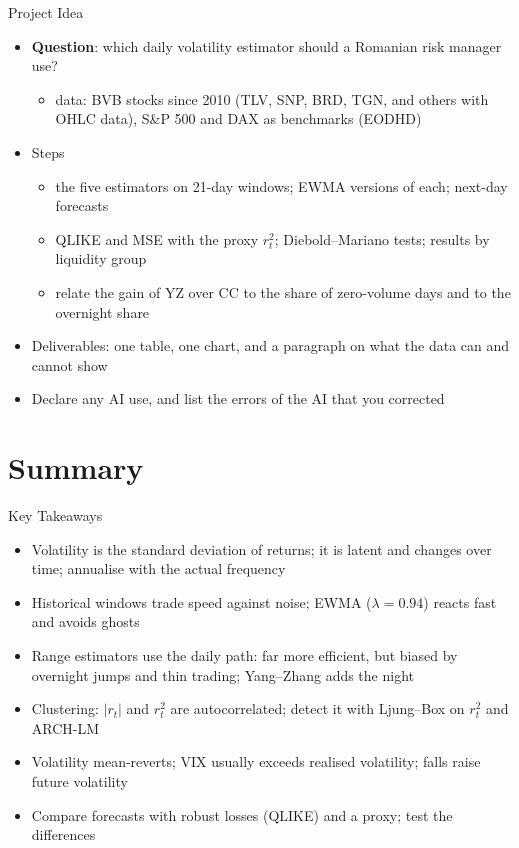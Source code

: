 \begin{frame}{Project Idea}
\itemsize{\small}
\begin{itemize}
    \item \textbf{Question}: which daily volatility estimator should a Romanian risk manager use?
    \begin{itemize}
        \item data: BVB stocks since 2010 (TLV, SNP, BRD, TGN, and others with OHLC data), S\&P 500 and DAX as benchmarks (EODHD)
    \end{itemize}
    \item Steps
    \begin{itemize}
        \item the five estimators on 21-day windows; EWMA versions of each; next-day forecasts
        \item QLIKE and MSE with the proxy $r_t^2$; Diebold--Mariano tests; results by liquidity group
        \item relate the gain of YZ over CC to the share of zero-volume days and to the overnight share
    \end{itemize}
    \item Deliverables: one table, one chart, and a paragraph on what the data can and cannot show
    \item Declare any AI use, and list the errors of the AI that you corrected
\end{itemize}
\end{frame}


\section{Summary}

\begin{frame}{Key Takeaways}
\itemsize{\small}
\begin{itemize}
    \item Volatility is the standard deviation of returns; it is latent and changes over time; annualise with the actual frequency
    \item Historical windows trade speed against noise; EWMA ($\lambda = 0.94$) reacts fast and avoids ghosts
    \item Range estimators use the daily path: far more efficient, but biased by overnight jumps and thin trading; Yang--Zhang adds the night
    \item Clustering: $|r_t|$ and $r_t^2$ are autocorrelated; detect it with Ljung--Box on $r_t^2$ and ARCH-LM
    \item Volatility mean-reverts; VIX usually exceeds realised volatility; falls raise future volatility
    \item Compare forecasts with robust losses (QLIKE) and a proxy; test the differences
\end{itemize}
\end{frame}

